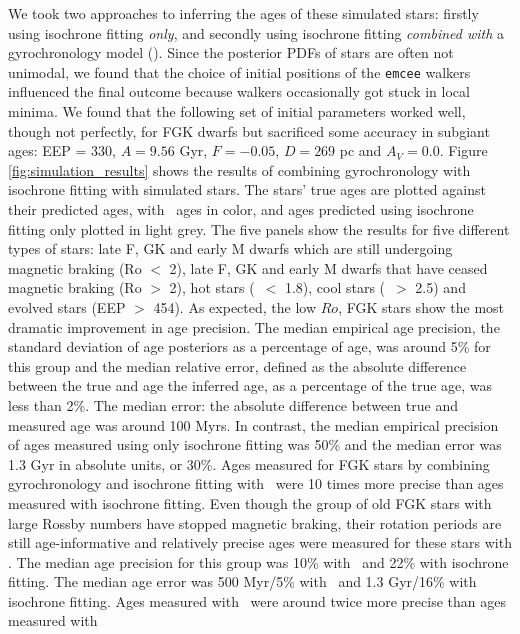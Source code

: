 We took two approaches to inferring the ages of these simulated stars:
firstly using isochrone fitting {\it only}, and secondly using isochrone
fitting {\it combined with} a gyrochronology model (\sd).
Since the posterior PDFs of stars are often not unimodal, we found that the
choice of initial positions of the {\tt emcee} walkers influenced the final
outcome because walkers occasionally got stuck in local minima.
We found that the following set of initial parameters worked well, though not
perfectly, for FGK dwarfs but sacrificed some accuracy in subgiant ages: EEP =
330, $A = 9.56$ Gyr, $F = -0.05$, $D = 269$ pc and $A_V = 0.0$.
Figure \ref{fig:simulation_results} shows the results of combining
gyrochronology with isochrone fitting with simulated stars.
The stars' true ages are plotted against their predicted ages, with \sd\ ages
in color, and ages predicted using isochrone fitting only plotted in light
grey.
The five panels show the results for five different types of stars: late F, GK
and early M dwarfs which are still undergoing magnetic braking (Ro $<$ 2),
late F, GK and early M dwarfs that have ceased magnetic braking (Ro $>$ 2),
hot stars (\gcolor\ $<$ 1.8), cool stars (\gcolor\ $>$ 2.5) and evolved stars
(EEP $>$ 454).
As expected, the low $Ro$, FGK stars show the most dramatic improvement in age
precision.
The median empirical age precision, the standard deviation of age posteriors
as a percentage of age, was around 5\% for this group and the median relative
error, defined as the absolute difference between the true and age the
inferred age, as a percentage of the true age, was less than 2\%.
The median error: the absolute difference between true and measured age was
around 100 Myrs.
In contrast, the median empirical precision of ages measured using only
isochrone fitting was 50\% and the median error was 1.3 Gyr in absolute units,
or 30\%.
Ages measured for FGK stars by combining gyrochronology and isochrone fitting
with \sd\ were 10 times more precise than ages measured with isochrone
fitting.
Even though the group of old FGK stars with large Rossby numbers have stopped
magnetic braking, their rotation periods are still age-informative and
relatively precise ages were measured for these stars with \sd.
The median age precision for this group was 10\% with \sd\ and 22\% with
isochrone fitting.
The median age error was 500 Myr/5\% with \sd\ and 1.3 Gyr/16\% with isochrone
fitting.
Ages measured with \sd\ were around twice more precise than ages measured with
